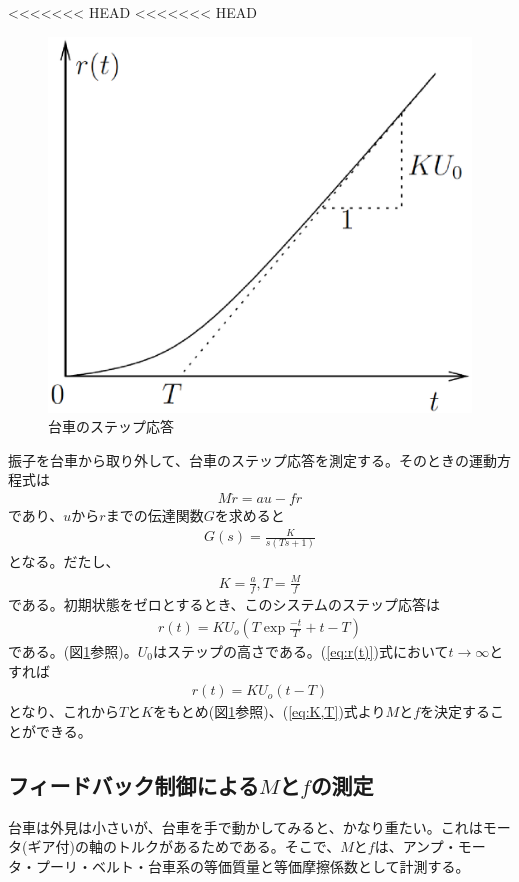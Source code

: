 \documentclass[a4j,11pt,twoside]{ujbook}
\begin{document}
<<<<<<< HEAD
<<<<<<< HEAD
\begin{figure}[htbp]
	\begin{center}
		\includegraphics[width = 0.6 \linewidth]{cart_step.eps}
		\caption{台車のステップ応答}
		\label{fig:台車のステップ応答}
	\end{center}
\end{figure}

振子を台車から取り外して、台車のステップ応答を測定する。そのときの運動方程式は
\begin{eqnarray}
	M\ddot{r} = au - fr
\end{eqnarray}
であり、$u$から$r$までの伝達関数$G$を求めると
\begin{eqnarray}
	G(s) = \frac{K}{s(Ts+1)}
\end{eqnarray}
となる。だたし、
\begin{eqnarray}
K = \frac{a}{f},T = \frac{M}{f}
\label{eq:K,T}
\end{eqnarray}
である。初期状態をゼロとするとき、このシステムのステップ応答は
\begin{eqnarray}
r(t) = KU_o(T\exp{\frac{-t}{T}}+t-T)
\label{eq:r(t)}
\end{eqnarray}
である。(図\ref{fig:台車のステップ応答}参照)。$U_0$はステップの高さである。(\ref{eq:r(t)})式において$t→∞$とすれば
\begin{eqnarray}
r(t) = KU_o(t-T)
\end{eqnarray}
となり、これから$T$と$K$をもとめ(図\ref{fig:台車のステップ応答}参照)、(\ref{eq:K,T})式より$M$と$f$を決定することができる。

\subsection{フィードバック制御による$M$と$f$の測定}
台車は外見は小さいが、台車を手で動かしてみると、かなり重たい。これはモータ(ギア付)の軸のトルクがあるためである。そこで、$M$と$f$は、アンプ・モータ・プーリ・ベルト・台車系の等価質量と等価摩擦係数として計測する。
\end{document}
